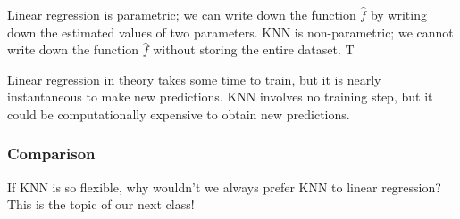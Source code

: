 \documentclass[titlepage,10pt]{scrartcl}
\begin{document}
Linear regression is parametric; we can write down the function $\hat{f}$ by writing down the estimated values of two parameters. KNN is non-parametric; we cannot write down the function $\hat{f}$ without storing the entire dataset. T

Linear regression in theory takes some time to train, but it is nearly instantaneous to make new predictions. KNN involves no training step, but it could be computationally expensive to obtain new predictions. 

\subsubsection{Comparison}

If KNN is so flexible, why wouldn't we always prefer KNN to linear regression? This is the topic of our next class! 
\end{document}
